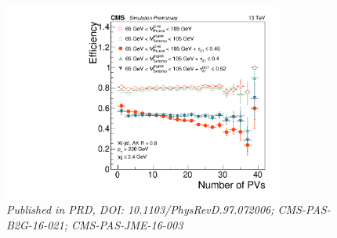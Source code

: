 \begin{figure}[b!]
    \centering
    \includegraphics[height=6.5cm]{figures/vtagging/JME-16-003/BoostedW/WtagSigEffvsNPV.pdf}
    \vspace*{10mm}
    \caption*{\footnotesize{\textit{Published in PRD, DOI: 10.1103/PhysRevD.97.072006; CMS-PAS-B2G-16-021; CMS-PAS-JME-16-003}}}
\end{figure}
\vspace*{\fill}


\clearpage

\clearpage

